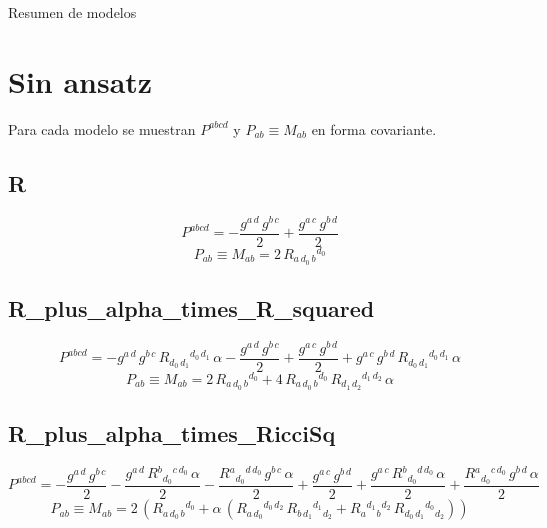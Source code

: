\documentclass[10pt]{article}
\begin{document}
\begin{center}{\Large Resumen de modelos}\end{center}
\small
\section*{Sin ansatz}
Para cada modelo se muestran $P^{abcd}$ y $P_{ab}\equiv M_{ab}$ en forma covariante.
\subsection*{R}
\begin{dmath*}P^{abcd}=-\frac{g{}^{a\,d}\,g{}^{b\,c}}{2} + \frac{g{}^{a\,c}\,g{}^{b\,d}}{2}\end{dmath*}
\begin{dmath*}P_{ab}\equiv M_{ab}=2\,R{}_{a\,d_{0}\,b}{}^{d_{0}}\end{dmath*}
\subsection*{R\_plus\_alpha\_times\_R\_squared}
\begin{dmath*}P^{abcd}=-g{}^{a\,d}\,g{}^{b\,c}\,R{}_{d_{0}\,d_{1}}{}^{d_{0}\,d_{1}}\,\alpha - \frac{g{}^{a\,d}\,g{}^{b\,c}}{2} + \frac{g{}^{a\,c}\,g{}^{b\,d}}{2} + g{}^{a\,c}\,g{}^{b\,d}\,R{}_{d_{0}\,d_{1}}{}^{d_{0}\,d_{1}}\,\alpha\end{dmath*}
\begin{dmath*}P_{ab}\equiv M_{ab}=2\,R{}_{a\,d_{0}\,b}{}^{d_{0}} + 4\,R{}_{a\,d_{0}\,b}{}^{d_{0}}\,R{}_{d_{1}\,d_{2}}{}^{d_{1}\,d_{2}}\,\alpha\end{dmath*}
\subsection*{R\_plus\_alpha\_times\_RicciSq}
\begin{dmath*}P^{abcd}=-\frac{g{}^{a\,d}\,g{}^{b\,c}}{2} - \frac{g{}^{a\,d}\,R{}^{b}{}_{d_{0}}{}^{c\,d_{0}}\,\alpha}{2} - \frac{R{}^{a}{}_{d_{0}}{}^{d\,d_{0}}\,g{}^{b\,c}\,\alpha}{2} + \frac{g{}^{a\,c}\,g{}^{b\,d}}{2} + \frac{g{}^{a\,c}\,R{}^{b}{}_{d_{0}}{}^{d\,d_{0}}\,\alpha}{2} + \frac{R{}^{a}{}_{d_{0}}{}^{c\,d_{0}}\,g{}^{b\,d}\,\alpha}{2}\end{dmath*}
\begin{dmath*}P_{ab}\equiv M_{ab}=2\,\left(R{}_{a\,d_{0}\,b}{}^{d_{0}} + \alpha\,\left(R{}_{a\,d_{0}}{}^{d_{0}\,d_{2}}\,R{}_{b\,d_{1}}{}^{d_{1}}{}_{d_{2}} + R{}_{a}{}^{d_{1}}{}_{b}{}^{d_{2}}\,R{}_{d_{0}\,d_{1}}{}^{d_{0}}{}_{d_{2}}\right)\right)\end{dmath*}
\end{document}
